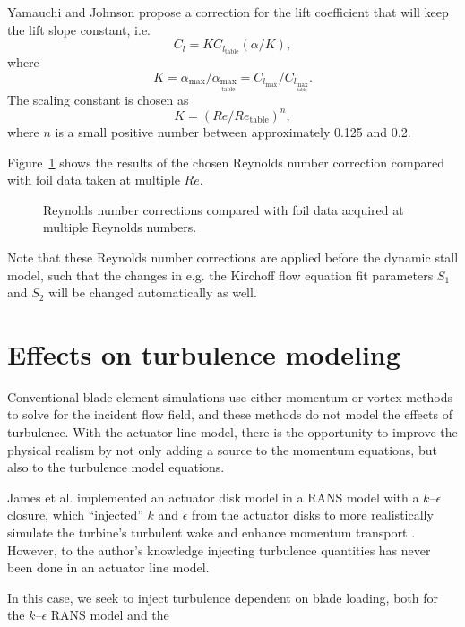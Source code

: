 Yamauchi and Johnson propose a correction for the lift coefficient that will keep the lift slope constant, i.e.
\begin{equation}
C_l = K C_{l_\mathrm{table}} (\alpha/K),
\end{equation}
where
\begin{equation}
K = \alpha_{\max} / \alpha_{\max_\mathrm{table}} = C_{l_{\max}} /
C_{l_{\max_\mathrm{table}}}.
\end{equation}
The scaling constant is chosen as
\begin{equation}
K = \left( Re/Re_\mathrm{table} \right)^n,
\end{equation}
where $n$ is a small positive number between approximately 0.125 and 0.2.

Figure~\ref{fig:Re-corrections} shows the results of the chosen Reynolds number
correction compared with foil data taken at multiple $Re$.

\begin{figure}
\caption{Reynolds number corrections compared with foil data acquired at
multiple Reynolds numbers.}
\label{fig:Re-corrections}
\end{figure}

Note that these Reynolds number corrections are applied before the dynamic stall
model, such that the changes in e.g. the Kirchoff flow equation fit parameters
$S_1$ and $S_2$ will be changed automatically as well.


\section{Effects on turbulence modeling}

Conventional blade element simulations use either momentum or vortex methods to
solve for the incident flow field, and these methods do not model the effects of
turbulence. With the actuator line model, there is the opportunity to improve
the physical realism by not only adding a source to the momentum equations, but
also to the turbulence model equations.

James et al. implemented an actuator disk model in a RANS model with a
$k$--$\epsilon$ closure, which ``injected'' $k$ and $\epsilon$ from the actuator
disks to more realistically simulate the turbine's turbulent wake and enhance
momentum transport \cite{James2010}. However, to the author's knowledge
injecting turbulence quantities has never been done in an actuator line model.

In this case, we seek to inject turbulence dependent on blade loading, both
for the $k$--$\epsilon$ RANS model and the

